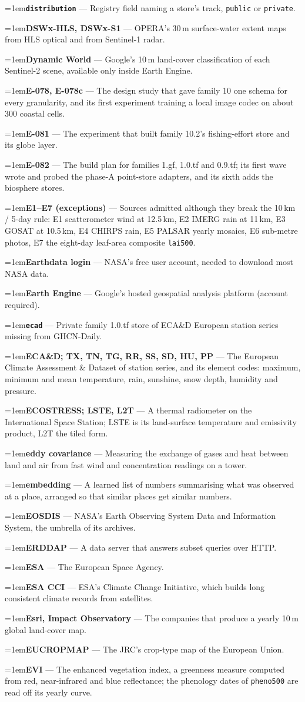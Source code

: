 \documentclass[10pt]{article}
\newcommand{\code}[1]{\texttt{#1}}
\newcommand{\gl}[2]{\par\hangindent=1em\hangafter=1\textbf{#1} --- #2\par}
\begin{document}
\gl{\code{distribution}}{Registry field naming a store's track, \code{public} or \code{private}.}
\gl{DSWx-HLS, DSWx-S1}{OPERA's 30\,m surface-water extent maps from HLS optical and from Sentinel-1 radar.}
\gl{Dynamic World}{Google's 10\,m land-cover classification of each Sentinel-2 scene, available only inside Earth Engine.}
\gl{E-078, E-078c}{The design study that gave family 10 one schema for every granularity, and its first experiment training a local image codec on about 300 coastal cells.}
\gl{E-081}{The experiment that built family 10.2's fishing-effort store and its globe layer.}
\gl{E-082}{The build plan for families 1.gf, 1.0.tf and 0.9.tf; its first wave wrote and probed the phase-A point-store adapters, and its sixth adds the biosphere stores.}
\gl{E1--E7 (exceptions)}{Sources admitted although they break the 10\,km / 5-day rule: E1 scatterometer wind at 12.5\,km, E2 IMERG rain at 11\,km, E3 GOSAT at 10.5\,km, E4 CHIRPS rain, E5 PALSAR yearly mosaics, E6 sub-metre photos, E7 the eight-day leaf-area composite \code{lai500}.}
\gl{Earthdata login}{NASA's free user account, needed to download most NASA data.}
\gl{Earth Engine}{Google's hosted geospatial analysis platform (account required).}
\gl{\code{ecad}}{Private family 1.0.tf store of ECA\&D European station series missing from GHCN-Daily.}
\gl{ECA\&D; TX, TN, TG, RR, SS, SD, HU, PP}{The European Climate Assessment \& Dataset of station series, and its element codes: maximum, minimum and mean temperature, rain, sunshine, snow depth, humidity and pressure.}
\gl{ECOSTRESS; LSTE, L2T}{A thermal radiometer on the International Space Station; LSTE is its land-surface temperature and emissivity product, L2T the tiled form.}
\gl{eddy covariance}{Measuring the exchange of gases and heat between land and air from fast wind and concentration readings on a tower.}
\gl{embedding}{A learned list of numbers summarising what was observed at a place, arranged so that similar places get similar numbers.}
\gl{EOSDIS}{NASA's Earth Observing System Data and Information System, the umbrella of its archives.}
\gl{ERDDAP}{A data server that answers subset queries over HTTP.}
\gl{ESA}{The European Space Agency.}
\gl{ESA CCI}{ESA's Climate Change Initiative, which builds long consistent climate records from satellites.}
\gl{Esri, Impact Observatory}{The companies that produce a yearly 10\,m global land-cover map.}
\gl{EUCROPMAP}{The JRC's crop-type map of the European Union.}
\gl{EVI}{The enhanced vegetation index, a greenness measure computed from red, near-infrared and blue reflectance; the phenology dates of \code{pheno500} are read off its yearly curve.}
\end{document}
